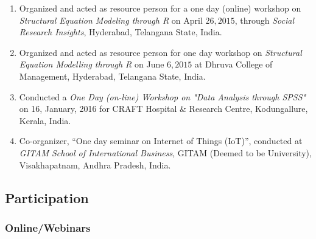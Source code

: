 \documentclass[10pt]{article}
\begin{document}
\begin{enumerate}

\item Organized and acted as resource person for a one day (online) workshop on \emph{Structural Equation Modeling through R} on April $26, 2015$, through \emph{Social Research Insights}, Hyderabad, Telangana State, India. 

\item Organized and acted as resource person for one day workshop on \emph{Structural Equation Modelling through R} on June $6, 2015$ at Dhruva College of Management, Hyderabad, Telangana State, India. 

\item Conducted a \emph{One Day (on-line) Workshop on "Data Analysis through SPSS"} on 16, January, 2016 for CRAFT Hospital \& Research Centre, Kodungallure, Kerala, India. 

\item Co-organizer, \enquote{One day seminar on Internet of Things (IoT)}, conducted at \emph{GITAM School of International Business}, GITAM (Deemed to be University), Visakhapatnam, Andhra Pradesh, India. 

\end{enumerate}

\subsection{Participation}

\subsubsection{Online/Webinars} 
\end{document}
